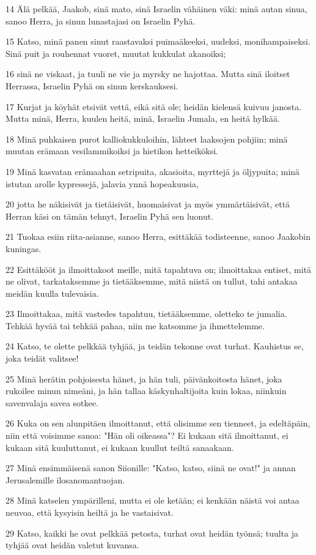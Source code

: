 \par 14 Älä pelkää, Jaakob, sinä mato, sinä Israelin vähäinen väki: minä autan sinua, sanoo Herra, ja sinun lunastajasi on Israelin Pyhä.
\par 15 Katso, minä panen sinut raastavaksi puimaäkeeksi, uudeksi, monihampaiseksi. Sinä puit ja rouhennat vuoret, muutat kukkulat akanoiksi;
\par 16 sinä ne viskaat, ja tuuli ne vie ja myrsky ne hajottaa. Mutta sinä iloitset Herrassa, Israelin Pyhä on sinun kerskauksesi.
\par 17 Kurjat ja köyhät etsivät vettä, eikä sitä ole; heidän kielensä kuivuu janosta. Mutta minä, Herra, kuulen heitä, minä, Israelin Jumala, en heitä hylkää.
\par 18 Minä puhkaisen purot kalliokukkuloihin, lähteet laaksojen pohjiin; minä muutan erämaan vesilammikoiksi ja hietikon hetteiköksi.
\par 19 Minä kasvatan erämaahan setripuita, akasioita, myrttejä ja öljypuita; minä istutan arolle kypressejä, jalavia ynnä hopeakuusia,
\par 20 jotta he näkisivät ja tietäisivät, huomaisivat ja myös ymmärtäisivät, että Herran käsi on tämän tehnyt, Israelin Pyhä sen luonut.
\par 21 Tuokaa esiin riita-asianne, sanoo Herra, esittäkää todisteenne, sanoo Jaakobin kuningas.
\par 22 Esittäkööt ja ilmoittakoot meille, mitä tapahtuva on; ilmoittakaa entiset, mitä ne olivat, tarkataksemme ja tietääksemme, mitä niistä on tullut, tahi antakaa meidän kuulla tulevaisia.
\par 23 Ilmoittakaa, mitä vastedes tapahtuu, tietääksemme, oletteko te jumalia. Tehkää hyvää tai tehkää pahaa, niin me katsomme ja ihmettelemme.
\par 24 Katso, te olette pelkkää tyhjää, ja teidän tekonne ovat turhat. Kauhistus se, joka teidät valitsee!
\par 25 Minä herätin pohjoisesta hänet, ja hän tuli, päivänkoitosta hänet, joka rukoilee minun nimeäni, ja hän tallaa käskynhaltijoita kuin lokaa, niinkuin savenvalaja savea sotkee.
\par 26 Kuka on sen alunpitäen ilmoittanut, että olisimme sen tienneet, ja edeltäpäin, niin että voisimme sanoa: "Hän oli oikeassa"? Ei kukaan sitä ilmoittanut, ei kukaan sitä kuuluttanut, ei kukaan kuullut teiltä sanaakaan.
\par 27 Minä ensimmäisenä sanon Siionille: "Katso, katso, siinä ne ovat!" ja annan Jerusalemille ilosanomantuojan.
\par 28 Minä katselen ympärilleni, mutta ei ole ketään; ei kenkään näistä voi antaa neuvoa, että kysyisin heiltä ja he vastaisivat.
\par 29 Katso, kaikki he ovat pelkkää petosta, turhat ovat heidän työnsä; tuulta ja tyhjää ovat heidän valetut kuvansa.

